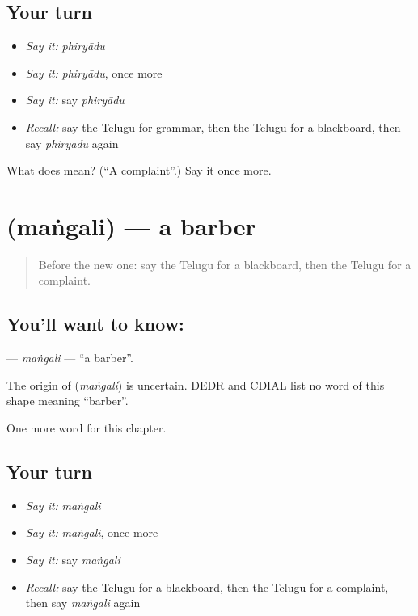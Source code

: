 \subsection*{Your turn}
\begin{itemize}
\raggedright
  \item \emph{Say it:} \emph{phiryādu}
  \item \emph{Say it:} \emph{phiryādu}, once more
  \item \emph{Say it:} say \emph{phiryādu}
  \item \emph{Recall:} say the Telugu for grammar, then the Telugu for a blackboard, then say \emph{phiryādu} again
\end{itemize}

\begin{tcolorbox}[breakable,colback=teal!4,colframe=teal!35!black,title={Before you move on}]
What does  mean? (\textquotedblleft{}A complaint\textquotedblright{}.) Say it once more.
\end{tcolorbox}
\section[\texorpdfstring{\te{మంగలి} (maṅgali)}{మంగలి (maṅgali)}]{ (maṅgali) — a barber}

\label{lesson:TE-C277-mangali}



\begin{quote}
Before the new one: say the Telugu for a blackboard, then the Telugu for a complaint.
\end{quote}

\subsection*{You'll want to know: }
\textbf{} — \emph{maṅgali} — \textquotedblleft{}a barber\textquotedblright{}.

\begin{cousinweb}
The origin of \textbf{} (\emph{maṅgali}) is uncertain. DEDR and CDIAL list no word of this shape meaning \textquotedblleft{}barber\textquotedblright{}.
\end{cousinweb}

\begin{grammarlens}[title={What you've built}]
One more word for this chapter.
\end{grammarlens}

\subsection*{Your turn}
\begin{itemize}
\raggedright
  \item \emph{Say it:} \emph{maṅgali}
  \item \emph{Say it:} \emph{maṅgali}, once more
  \item \emph{Say it:} say \emph{maṅgali}
  \item \emph{Recall:} say the Telugu for a blackboard, then the Telugu for a complaint, then say \emph{maṅgali} again
\end{itemize}

